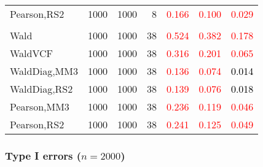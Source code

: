 \documentclass[
]{article}
\begin{document}
\begin{table}[H]
{\begin{tabular}[t]{lrrrrrr}
\hspace{1em}Pearson,RS2 & 1000 & 1000 & 8 & \textcolor{red}{0.166} & \textcolor{red}{0.100} & \textcolor{red}{0.029}\\
\addlinespace[0.3em]
\multicolumn{7}{l}{\textbf{3F 15V}}\\
\hspace{1em}Wald & 1000 & 1000 & 38 & \textcolor{red}{0.524} & \textcolor{red}{0.382} & \textcolor{red}{0.178}\\
\hspace{1em}WaldVCF & 1000 & 1000 & 38 & \textcolor{red}{0.316} & \textcolor{red}{0.201} & \textcolor{red}{0.065}\\
\hspace{1em}WaldDiag,MM3 & 1000 & 1000 & 38 & \textcolor{red}{0.136} & \textcolor{red}{0.074} & \textcolor{black}{0.014}\\
\hspace{1em}WaldDiag,RS2 & 1000 & 1000 & 38 & \textcolor{red}{0.139} & \textcolor{red}{0.076} & \textcolor{black}{0.018}\\
\hspace{1em}Pearson,MM3 & 1000 & 1000 & 38 & \textcolor{red}{0.236} & \textcolor{red}{0.119} & \textcolor{red}{0.046}\\
\hspace{1em}Pearson,RS2 & 1000 & 1000 & 38 & \textcolor{red}{0.241} & \textcolor{red}{0.125} & \textcolor{red}{0.049}\\
\bottomrule
\end{tabular}}
\endgroup{}
\end{table}

\hypertarget{type-i-errors-n2000-1}{%
\subsubsection{\texorpdfstring{Type I errors
(\(n=2000\))}{Type I errors (n=2000)}}\label{type-i-errors-n2000-1}}
\end{document}
